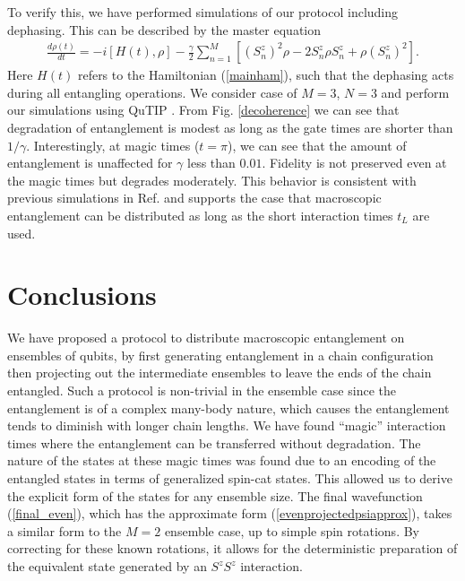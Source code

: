 \documentclass{WileyMSP-template}
\begin{document}
{{To verify this, we have performed simulations of our protocol including dephasing. This can be described by the master equation
%
\begin{align}
\frac{d \rho(t)}{dt} = -i [H(t), \rho] - \frac{\gamma}{2} \sum_{n=1}^M \left[ (S^z_n)^2 \rho
-2 S^z_n \rho S^z_n + \rho  (S^z_n)^2 \right] .
\label{dephasingmaster}
\end{align}
%
Here $ H(t) $ refers to the Hamiltonian (\ref{mainham}), such that the dephasing acts during all entangling operations. We consider case of $M=3$, $N=3$ and perform our simulations using QuTIP \cite{qutip}.
From Fig. \ref{decoherence} we can see that degradation of entanglement is modest as long as the gate times are shorter than $1/\gamma$.  Interestingly, at magic times ($t = \pi $), we can see that the amount of entanglement is unaffected for $\gamma$ less than $0.01$. Fidelity is not preserved even at the magic times but degrades moderately. This behavior is consistent with previous simulations in Ref. \cite{byrnes2013fractality,rosseau2014} and supports the case that macroscopic entanglement can be distributed as long as the short interaction times $t_L $ are used.
}









\section{Conclusions}

We have proposed a protocol to distribute macroscopic
entanglement on ensembles of qubits, by first generating entanglement in a chain configuration then projecting out the intermediate ensembles to leave the ends of the chain entangled.  Such a protocol is non-trivial in the ensemble case since the entanglement is of a complex many-body nature, which causes the entanglement tends to diminish with longer chain lengths.  We have found ``magic'' interaction times where the entanglement can be transferred without degradation.  The nature of the states at these magic times was found due to an encoding of the entangled states in terms of generalized spin-cat states.  This allowed us to derive the explicit form of the states for any ensemble size. The final wavefunction (\ref{final_even}), which has the approximate form (\ref{evenprojectedpsiapprox}), takes a similar form to the $ M = 2 $ ensemble case, up to simple spin rotations.  By correcting for these known rotations, it allows for the deterministic preparation of the equivalent state generated by an $ S^z S^z $ interaction.

}
\end{document}

